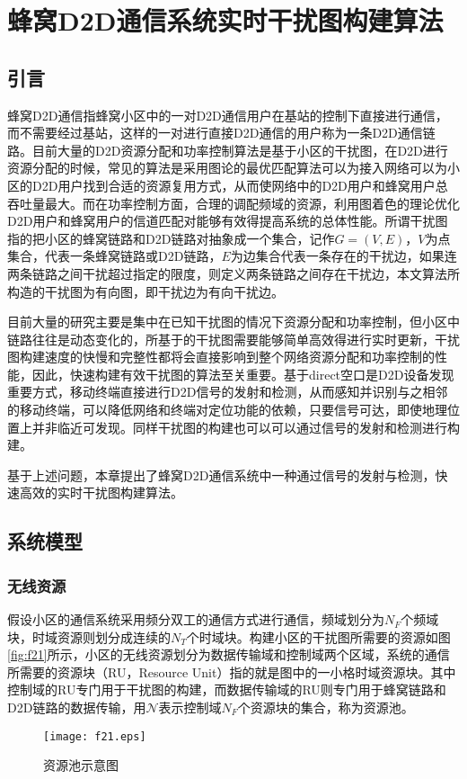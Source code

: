 \documentclass[figurelist,tablelist,algorithmlist,nomlist,masters]{seuthesix}
\begin{document}
	\chapter{蜂窝D2D通信系统实时干扰图构建算法}
	\section{引言}
	蜂窝D2D通信指蜂窝小区中的一对D2D通信用户在基站的控制下直接进行通信，而不需要经过基站，这样的一对进行直接D2D通信的用户称为一条D2D通信链路。目前大量的D2D资源分配和功率控制算法是基于小区的干扰图，在D2D进行资源分配的时候，常见的算法是采用图论的最优匹配算法可以为接入网络可以为小区的D2D用户找到合适的资源复用方式，从而使网络中的D2D用户和蜂窝用户总吞吐量最大。而在功率控制方面，合理的调配频域的资源，利用图着色的理论优化D2D用户和蜂窝用户的信道匹配对能够有效得提高系统的总体性能。所谓干扰图指的把小区的蜂窝链路和D2D链路对抽象成一个集合，记作$G=(V,E)$，$V$为点集合，代表一条蜂窝链路或D2D链路，$E$为边集合代表一条存在的干扰边，如果连两条链路之间干扰超过指定的限度，则定义两条链路之间存在干扰边，本文算法所构造的干扰图为有向图，即干扰边为有向干扰边。

	目前大量的研究主要是集中在已知干扰图的情况下资源分配和功率控制，但小区中链路往往是动态变化的，所基于的干扰图需要能够简单高效得进行实时更新，干扰图构建速度的快慢和完整性都将会直接影响到整个网络资源分配和功率控制的性能，因此，快速构建有效干扰图的算法至关重要。基于direct空口是D2D设备发现重要方式，移动终端直接进行D2D信号的发射和检测，从而感知并识别与之相邻的移动终端，可以降低网络和终端对定位功能的依赖，只要信号可达，即使地理位置上并非临近可发现。同样干扰图的构建也可以可以通过信号的发射和检测进行构建。
	
	基于上述问题，本章提出了蜂窝D2D通信系统中一种通过信号的发射与检测，快速高效的实时干扰图构建算法。
	
	\section{系统模型}
	\subsection{无线资源}
	假设小区的通信系统采用频分双工的通信方式进行通信，频域划分为$N_{F}$个频域块，时域资源则划分成连续的$N_{T}$个时域块。构建小区的干扰图所需要的资源如图\ref{fig:f21}所示，小区的无线资源划分为数据传输域和控制域两个区域，系统的通信所需要的资源块（RU，Resource Unit）指的就是图中的一小格时域资源块。其中控制域的RU专门用于干扰图的构建，而数据传输域的RU则专门用于蜂窝链路和D2D链路的数据传输，用$\mathcal{N}$表示控制域$N_{F}$个资源块的集合，称为资源池。
	\begin{figure}[htb]
	  \centering
	  \texttt{[image: f21.eps]}
	  \caption{资源池示意图}\label{f21}
	\end{figure}
\end{document}
